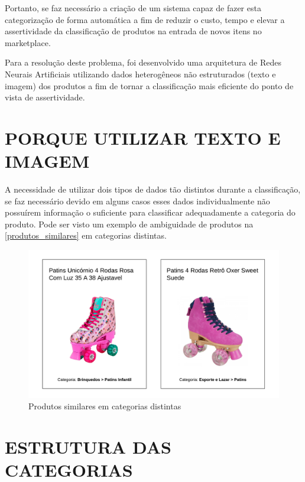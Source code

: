 Portanto, se faz necessário a criação de um sistema capaz de fazer esta categorização de forma automática a fim de reduzir o custo, tempo e elevar a assertividade da classificação de produtos na entrada de novos itens no marketplace. 

Para a resolução deste problema, foi desenvolvido uma arquitetura de Redes Neurais Artificiais utilizando dados heterogêneos não estruturados (texto e imagem) dos produtos a fim de tornar a classificação mais eficiente do ponto de vista de assertividade.

\section{PORQUE UTILIZAR TEXTO E IMAGEM}

A necessidade de utilizar dois tipos de dados tão distintos durante a classificação, se faz necessário devido em alguns casos esses dados individualmente não possuírem informação o suficiente para classificar adequadamente a categoria do produto. Pode ser visto um exemplo de ambiguidade de produtos na \autoref{produtos_similares} em categorias distintas.

\begin{figure}[htb]
	\caption{\label{produtos_similares} Produtos similares em categorias distintas}
	\begin{center}
	    \includegraphics[scale=0.5]{artigo/recursos/imagens/produtos-similares.png}
	\end{center}
\end{figure}

\section{ESTRUTURA DAS CATEGORIAS}

